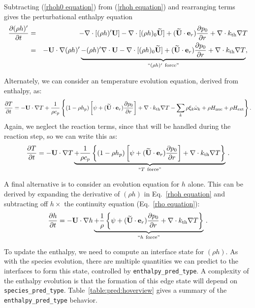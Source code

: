 Subtracting (\ref{rhoh0 equation}) from (\ref{rhoh equation}) and
rearranging terms gives the perturbational enthalpy equation
\begin{eqnarray}
\frac{\partial(\rho h)'}{\partial t} &=& -\nabla\cdot[(\rho h)'{\bf U}] 
- \nabla\cdot[(\rho h)_0\widetilde{{\bf U}}] + (\widetilde{{\bf U}} \cdot \mathbf{e}_r)\frac{\partial p_0}{\partial r} 
+ \nabla\cdot k_{\rm th}\nabla T\nonumber \\
&=& -{\bf U}\cdot\nabla(\rho h)' \underbrace{- (\rho h)'\nabla\cdot{\bf U} 
- \nabla\cdot[(\rho h)_0\widetilde{{\bf U}}] + (\widetilde{{\bf U}} \cdot \mathbf{e}_r)\frac{\partial p_0}{\partial r}
+ \nabla\cdot k_{\rm th}\nabla T}_{``(\rho h)' ~ \text{force}"}, \label{rhohprime equation}
\end{eqnarray}

Alternately, we can consider an temperature evolution equation, derived
from enthalpy, as:
\begin{equation}
\frac{\partial T}{\partial t} = -{\bf U}\cdot\nabla T
+ \frac{1}{\rho c_p}\left\{(1-\rho h_p)\left[\psi
+ (\widetilde{{\bf U}} \cdot \mathbf{e}_r )\frac{\partial p_0}{\partial r}\right] 
+ \nabla \cdot k_{\rm th} \nabla T
- \sum_k\rho\xi_k\dot{\omega}_k 
+ \rho H_{\rm nuc} + \rho H_{\rm ext}\right\}.
\end{equation}
Again, we neglect the reaction terms, since that will be handled during
the reaction step, so we can write this as:
\begin{equation}
\frac{\partial T}{\partial t} = -{\bf U}\cdot\nabla T
\underbrace{
+ \frac{1}{\rho c_p}\left\{(1-\rho h_p)\left[\psi
+ (\widetilde{{\bf U}} \cdot \mathbf{e}_r )\frac{\partial p_0}{\partial r}\right] 
+ \nabla \cdot k_{\rm th} \nabla T \right \} }_{``T~\text{force''}} \, .
\label{T equation labeled}
\end{equation}

A final alternative is to consider an evolution equation for $h$
alone.  This can be derived by expanding the derivative of $(\rho h)$
in Eq.~\ref{rhoh equation} and subtracting off $h \times$ the
continuity equation (Eq.~\ref{rho equation}):
\begin{equation}
\frac{\partial h}{\partial t} = -{\bf U} \cdot \nabla h 
\underbrace{+ \frac{1}{\rho}
\left \{ \psi + (\widetilde{{\bf U}} \cdot \mathbf{e}_r )\frac{\partial p_0}{\partial r}
+ \nabla \cdot k_{\rm th} \nabla T \right \} }_{``h~\text{force''}} \, .
\label{h equation labeled}
\end{equation}

To update the enthalpy, we need to compute an interface state for
$(\rho h)$.  As with the species evolution, there are multiple
quantities we can predict to the interfaces to form this state,
controlled by {\tt enthalpy\_pred\_type}.  A complexity of the
enthalpy evolution is that the formation of this edge state will
depend on {\tt species\_pred\_type}.  Table~\ref{table:pred:hoverview}
gives a summary
of the {\tt enthalpy\_pred\_type} behavior.

